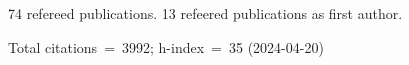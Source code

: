 74 refereed publications. 13 refeered publications as first author.

Total citations~=~3992; h-index~=~35 (2024-04-20)